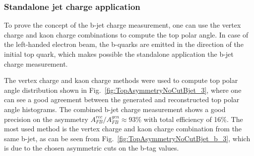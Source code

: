 \subsubsection{Standalone jet charge application}

To prove the concept of the b-jet charge measurement, one can use the vertex charge and kaon charge combinations to compute the top polar angle. 
In case of the left-handed electron beam, the b-quarks are emitted in the direction of the initial top quark, which makes possible the standalone application the b-jet charge measurement. 

The vertex charge and kaon charge methods were used to compute top polar angle distribution shown in Fig.~\ref{fig:TopAsymmetryNoCutBjet_3}, where one can see a good agreement between the generated and reconstructed top polar angle histograms. 
The combined b-jet charge measurement shows a good precision on the asymmetry $A_{FB}^{rec}/A^{gen}_{FB} \approx 93\%$ with total efficiency of 16\%.
The most used method is the vertex charge and kaon charge combination from the same b-jet, as can be seen from Fig.~\ref{fig:TopAsymmetryNoCutBjet_b_3}, which is due to the chosen asymmetric cuts on the b-tag values. 
